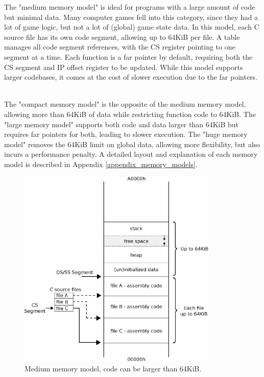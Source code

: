 \documentclass[book.tex]{subfiles}
\begin{document}
\par
The "medium memory model" is ideal for programs with a large amount of code but minimal data. Many computer games fell into this category, since they had a lot of game logic, but not a lot of (global) game state data. In this model, each C source file has its own code segment, allowing up to 64KiB per file. A table manages all code segment references, with the CS register pointing to one segment at a time. Each function is a far pointer by default, requiring both the CS segment and IP offset register to be updated. While this model supports larger codebases, it comes at the cost of slower execution due to the far pointers.\\

\\

\par
The "compact memory model" is the opposite of the medium memory model, allowing more than 64KiB of data while restricting function code to 64KiB. The "large memory model" supports both code and data larger than 64KiB but requires far pointers for both, leading to slower execution. The "huge memory model" removes the 64KiB limit on global data, allowing more flexibility, but also incurs a performance penalty. A detailed layout and explanation of each memory model is described in Appendix \ref{appendix_memory_models}.\\

\begin{figure}[H]
\centering
\includegraphics[width=0.85\textwidth]{imgs/drawings/memory/medium_mm.eps}
\caption{Medium memory model, code can be larger than 64KiB.}
\label{fig:mm_medium}
\end{figure}
\end{document}
